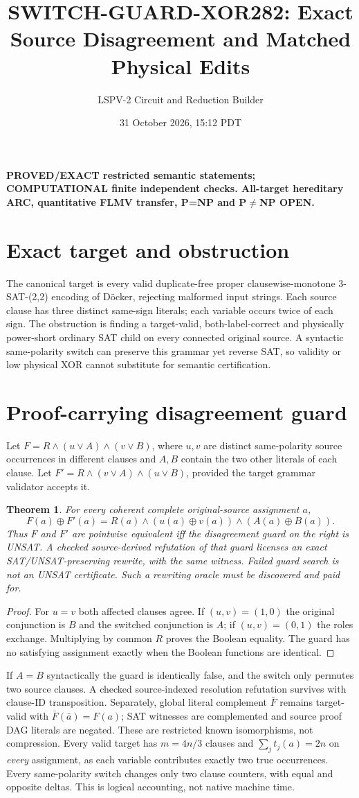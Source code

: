 \documentclass[11pt]{article}
\title{SWITCH-GUARD-XOR282: Exact Source Disagreement and Matched Physical Edits}
\author{LSPV-2 Circuit and Reduction Builder}
\date{31 October 2026, 15:12 PDT}
\newtheorem{theorem}{Theorem}
\begin{document}
\maketitle
\noindent\textbf{PROVED/EXACT restricted semantic statements; COMPUTATIONAL finite independent checks. All-target hereditary ARC, quantitative FLMV transfer, P=NP and P$\ne$NP OPEN.}
\section{Exact target and obstruction}
The canonical target is every valid duplicate-free proper clausewise-monotone 3-SAT-(2,2) encoding of D\"ocker, rejecting malformed input strings. Each source clause has three distinct same-sign literals; each variable occurs twice of each sign. The obstruction is finding a target-valid, both-label-correct and physically power-short ordinary SAT child on every connected original source. A syntactic same-polarity switch can preserve this grammar yet reverse SAT, so validity or low physical XOR cannot substitute for semantic certification.
\section{Proof-carrying disagreement guard}
Let $F=R\land(u\lor A)\land(v\lor B)$, where $u,v$ are distinct same-polarity source occurrences in different clauses and $A,B$ contain the two other literals of each clause. Let $F'=R\land(v\lor A)\land(u\lor B)$, provided the target grammar validator accepts it.
\begin{theorem}
For every coherent complete original-source assignment $a$,
\[
 F(a)\oplus F'(a)=R(a)\land(u(a)\oplus v(a))\land(A(a)\oplus B(a)).
\]
Thus $F$ and $F'$ are \emph{pointwise} equivalent iff the disagreement guard on the right is UNSAT. A checked source-derived refutation of that guard licenses an exact SAT/UNSAT-preserving rewrite, with the same witness. Failed guard search is not an UNSAT certificate. Such a rewriting oracle must be discovered and paid for.
\end{theorem}
\begin{proof}
For $u=v$ both affected clauses agree. If $(u,v)=(1,0)$ the original conjunction is $B$ and the switched conjunction is $A$; if $(u,v)=(0,1)$ the roles exchange. Multiplying by common $R$ proves the Boolean equality. The guard has no satisfying assignment exactly when the Boolean functions are identical.
\end{proof}
If $A=B$ syntactically the guard is identically false, and the switch only permutes two source clauses. A checked source-indexed resolution refutation survives with clause-ID transposition. Separately, global literal complement $\bar F$ remains target-valid with $\bar F(\bar a)=F(a)$; SAT witnesses are complemented and source proof DAG literals are negated. These are restricted known isomorphisms, not compression.
Every valid target has $m=4n/3$ clauses and $\sum_j t_j(a)=2n$ on \emph{every} assignment, as each variable contributes exactly two true occurrences. Every same-polarity switch changes only two clause counters, with equal and opposite deltas. This is logical accounting, not native machine time.
\end{document}
